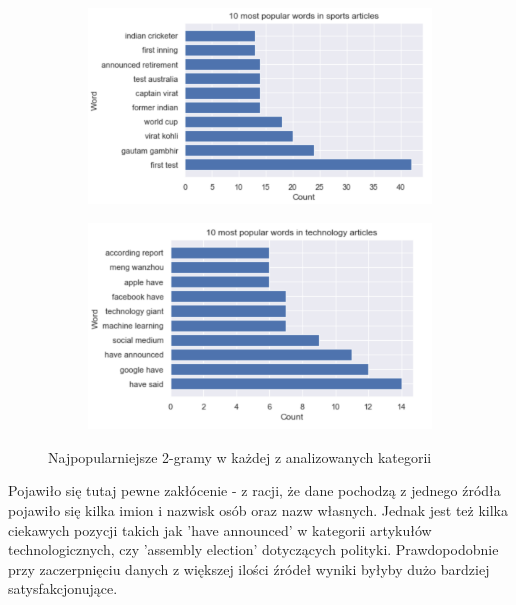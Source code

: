 \begin{figure}[H]\ContinuedFloat
     \begin{subfigure}[b]{0.7\textwidth}
         \centering
         \includegraphics[width=\textwidth]{images/analiza/sports_bigram.png}
     \end{subfigure}
     \hfill
     \begin{subfigure}[b]{0.7\textwidth}
         \centering
         \includegraphics[width=\textwidth]{images/analiza/technology_bigram.png}
     \end{subfigure}
        \caption{Najpopularniejsze 2-gramy w każdej z analizowanych kategorii}
        \label{fig:10_most_popular_ngrams}
\end{figure}

Pojawiło się tutaj pewne zakłócenie - z racji, że dane pochodzą z jednego źródła pojawiło się kilka imion i nazwisk osób oraz nazw własnych. Jednak jest też kilka ciekawych pozycji takich jak 'have announced' w kategorii artykułów technologicznych, czy 'assembly election' dotyczących polityki. Prawdopodobnie przy zaczerpnięciu danych z większej ilości źródeł wyniki byłyby dużo bardziej satysfakcjonujące.

